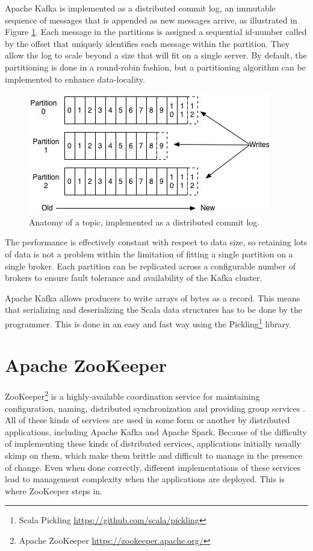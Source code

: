 Apache Kafka is implemented as a distributed commit log, an immutable sequence of messages that is appended as new messages arrive, as illustrated in Figure \ref{fig:kafkalog}. Each message in the partitions is assigned a sequential id-number called by the offset that uniquely identifies each message within the partition. They allow the log to scale beyond a size that will fit on a single server. By default, the partitioning is done in a round-robin fashion, but a partitioning algorithm can be implemented to enhance data-locality. 

\begin{figure}[ht!]
\centering
\includegraphics[width=.9\textwidth]{figures/kafkalog.jpg}
\caption{Anatomy of a topic, implemented as a distributed commit log\label{fig:kafkalog}.}
\end{figure}

The performance is effectively constant with respect to data size, so retaining lots of data is not a problem within the limitation of fitting a single partition on a single broker. Each partition can be replicated across a configurable number of brokers to ensure fault tolerance and availability of the Kafka cluster.

Apache Kafka allows producers to write arrays of bytes as a record. This means that serializing and deserializing the Scala data structures has to be done by the programmer. This is done in an easy and fast way using the Pickling\footnote{Scala Pickling \url{https://github.com/scala/pickling}} library. 

\section{Apache ZooKeeper \label{subsec_ZooKeeper}}

ZooKeeper\footnote{Apache ZooKeeper \url{https://zookeeper.apache.org/}} is a highly-available coordination service for maintaining configuration, naming, distributed synchronization and providing group services \cite{Hunt:2010}. All of these kinds of services are used in some form or another by distributed applications, including Apache Kafka and Apache Spark. Because of the difficulty of implementing these kinds of distributed services, applications initially usually skimp on them, which make them brittle and difficult to manage in the presence of change. Even when done correctly, different implementations of these services lead to management complexity when the applications are deployed. This is where ZooKeeper steps in.

